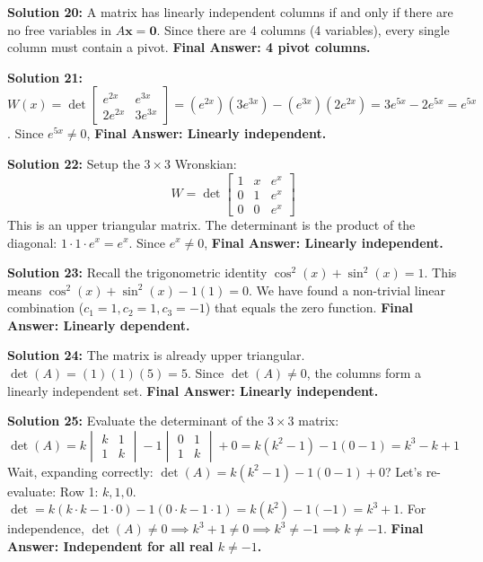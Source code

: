 \documentclass[12pt]{article}
\begin{document}
\textbf{Solution 20:} A matrix has linearly independent columns if and only if there are no free variables in $A\mathbf{x} = \mathbf{0}$. Since there are 4 columns (4 variables), every single column must contain a pivot. \textbf{Final Answer: 4 pivot columns.}

\textbf{Solution 21:} $W(x) = \det\begin{bmatrix} e^{2x} & e^{3x} \\ 2e^{2x} & 3e^{3x} \end{bmatrix} = (e^{2x})(3e^{3x}) - (e^{3x})(2e^{2x}) = 3e^{5x} - 2e^{5x} = e^{5x}$. Since $e^{5x} \neq 0$, \textbf{Final Answer: Linearly independent.}

\textbf{Solution 22:} Setup the $3 \times 3$ Wronskian:
$$ W = \det\begin{bmatrix} 1 & x & e^x \\ 0 & 1 & e^x \\ 0 & 0 & e^x \end{bmatrix} $$
This is an upper triangular matrix. The determinant is the product of the diagonal: $1 \cdot 1 \cdot e^x = e^x$. Since $e^x \neq 0$, \textbf{Final Answer: Linearly independent.}

\textbf{Solution 23:} Recall the trigonometric identity $\cos^2(x) + \sin^2(x) = 1$. This means $\cos^2(x) + \sin^2(x) - 1(1) = 0$. We have found a non-trivial linear combination ($c_1=1, c_2=1, c_3=-1$) that equals the zero function. \textbf{Final Answer: Linearly dependent.}

\textbf{Solution 24:} The matrix is already upper triangular. $\det(A) = (1)(1)(5) = 5$. Since $\det(A) \neq 0$, the columns form a linearly independent set. \textbf{Final Answer: Linearly independent.}

\textbf{Solution 25:} Evaluate the determinant of the $3 \times 3$ matrix:
$$ \det(A) = k\begin{vmatrix} k & 1 \\ 1 & k \end{vmatrix} - 1\begin{vmatrix} 0 & 1 \\ 1 & k \end{vmatrix} + 0 = k(k^2 - 1) - 1(0 - 1) = k^3 - k + 1 $$
Wait, expanding correctly:
$\det(A) = k(k^2 - 1) - 1(0 - 1) + 0$? Let's re-evaluate:
Row 1: $k, 1, 0$.
$\det = k(k \cdot k - 1 \cdot 0) - 1(0 \cdot k - 1 \cdot 1) = k(k^2) - 1(-1) = k^3 + 1$.
For independence, $\det(A) \neq 0 \implies k^3 + 1 \neq 0 \implies k^3 \neq -1 \implies k \neq -1$.
\textbf{Final Answer: Independent for all real $k \neq -1$.}
\end{document}
